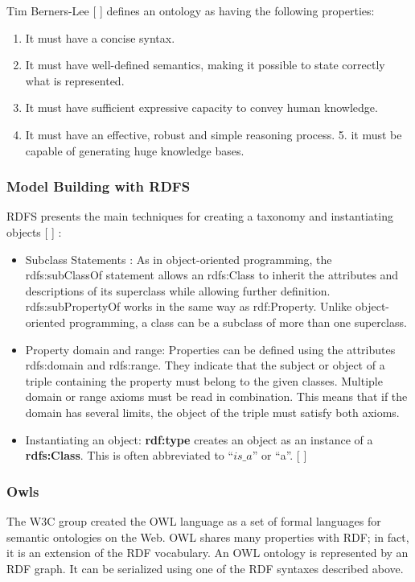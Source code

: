     Tim Berners-Lee [ ] defines an ontology as having the following properties: 
    \begin{enumerate}
        \item It must have a concise syntax.
        \item It must have well-defined semantics, making it possible to state correctly what is represented.
        \item It must have sufficient expressive capacity to convey human knowledge.
        \item It must have an effective, robust and simple reasoning process. 5. it must be capable of generating huge knowledge bases.
    \end{enumerate}


    \subsubsection{Model Building with RDFS}
    RDFS presents the main techniques for creating a taxonomy and instantiating objects [ ] : 

    \begin{itemize}
        \item Subclass Statements : As in object-oriented programming, the rdfs:subClassOf statement allows an rdfs:Class to inherit the attributes and descriptions of its superclass while allowing further definition. rdfs:subPropertyOf works in the same way as rdf:Property. Unlike object-oriented programming, a class can be a subclass of more than one superclass. 
        \item Property domain and range: Properties can be defined using the attributes rdfs:domain and rdfs:range. They indicate that the subject or object of a triple containing the property must belong to the given classes. Multiple domain or range axioms must be read in combination. This means that if the domain has several limits, the object of the triple must satisfy both axioms. 
        \item Instantiating an object: \textbf{rdf:type} creates an object as an instance of a \textbf{rdfs:Class}. This is often abbreviated to “$is\_a$” or “a”. [ ] 
    \end{itemize}
    
    \subsubsection{Owls}
    The W3C group created the OWL language as a set of formal languages for semantic ontologies on the Web. OWL shares many properties with RDF; in fact, it is an extension of the RDF vocabulary. An OWL ontology is represented by an RDF graph. It can be serialized using one of the RDF syntaxes described above. \\


